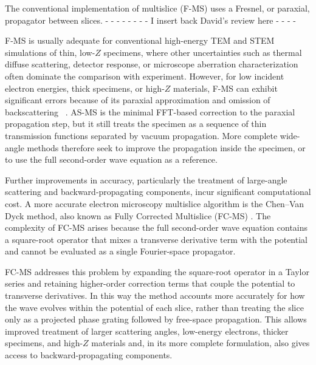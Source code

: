 \documentclass[preprint,12pt,number]{elsarticle}
\begin{document}
The conventional implementation of multislice (F-MS) uses a Fresnel, or paraxial, propagator between slices.
- - - - - - - -  I insert back David's review here - - - -

F-MS is usually adequate for conventional high-energy TEM and STEM simulations
of thin, low-$Z$ specimens, where other uncertainties such as thermal diffuse
scattering, detector response, or microscope aberration characterization often
dominate the comparison with experiment. However, for low incident electron
energies, thick specimens, or high-$Z$ materials, F-MS can exhibit significant
errors because of its paraxial approximation and omission of backscattering
~\cite{RotherScheerschmidt2009,hillier_role_2017,WackerSchroeder2015,ming2013pcms}.
AS-MS is the minimal FFT-based correction to the paraxial propagation step, but
it still treats the specimen as a sequence of thin transmission functions
separated by vacuum propagation. More complete wide-angle methods therefore
seek to improve the propagation inside the specimen, or to use the full
second-order wave equation as a reference.

Further improvements in accuracy, particularly the treatment of large-angle
scattering and backward-propagating components, incur significant computational
cost. A more accurate electron microscopy multislice algorithm is the
Chen--Van Dyck method, also known as Fully Corrected Multislice (FC-MS) \cite{ming2013pcms,ChenVanDyck1997}. The complexity 
of FC-MS arises because the full second-order wave equation contains a
square-root operator that mixes a transverse derivative term with the potential
and cannot be evaluated as a single Fourier-space propagator.

FC-MS addresses this problem by expanding the square-root
operator in a Taylor series and retaining higher-order correction terms that
couple the potential to transverse derivatives. In this way the method accounts
more accurately for how the wave evolves within the potential of each slice,
rather than treating the slice only as a projected phase grating followed by
free-space propagation. This allows improved treatment of larger scattering
angles, low-energy electrons, thicker specimens, and high-$Z$ materials and,
in its more complete formulation, also gives access to backward-propagating
components.
\end{document}

